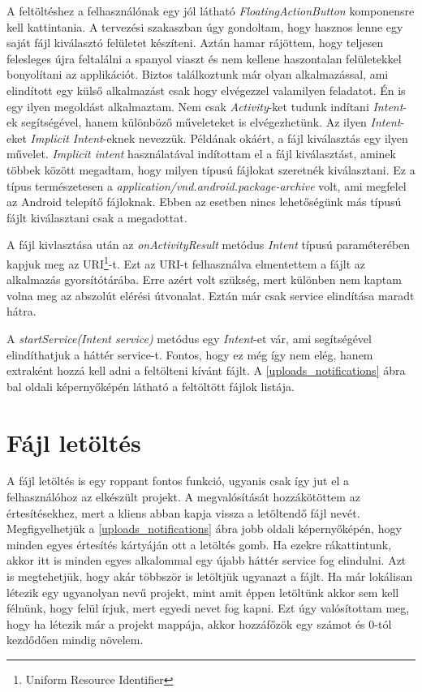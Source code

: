 \documentclass{thesis-ekf}
\theoremstyle{definition}
\theoremstyle{remark}
\begin{document}
A feltöltéshez a felhasználónak egy jól látható \emph{FloatingActionButton} komponensre kell kattintania.
A tervezési szakaszban úgy gondoltam, hogy hasznos lenne egy saját fájl kiválasztó felületet készíteni.
Aztán hamar rájöttem, hogy teljesen felesleges újra feltalálni a spanyol viaszt és nem kellene haszontalan felületekkel bonyolítani az applikációt.
Biztos találkoztunk már olyan alkalmazással, ami elindított egy külső alkalmazást csak hogy elvégezzel valamilyen feladatot.
Én is egy ilyen megoldást alkalmaztam.
Nem csak \emph{Activity}-ket tudunk indítani \emph{Intent}-ek segítségével, hanem különböző műveleteket is elvégezhetünk.
Az ilyen \emph{Intent}-eket \emph{Implicit Intent}-eknek nevezzük.
Példának okáért, a fájl kiválasztás egy ilyen művelet.
\emph{Implicit intent} használatával indítottam el a fájl kiválasztást, aminek többek között megadtam, hogy milyen típusú fájlokat szeretnék kiválasztani.
Ez a típus természetesen a \emph{application/vnd.android.package-archive} volt, ami megfelel az Android telepítő fájloknak.
Ebben az esetben nincs lehetőségünk más típusú fájlt kiválasztani csak a megadottat.

A fájl kivlasztása után az \emph{onActivityResult} metódus \emph{Intent} típusú paraméterében kapjuk meg az URI\footnote{Uniform Resource Identifier}-t.
Ezt az URI-t felhasználva elmentettem a fájlt az alkalmazás gyorsítótárába.
Erre azért volt szükség, mert különben nem kaptam volna meg az abszolút elérési útvonalat.
Eztán már csak service elindítása maradt hátra. 

A \emph{startService(Intent service)} metódus egy \emph{Intent}-et vár, ami segítségével elindíthatjuk a háttér service-t.
Fontos, hogy ez még így nem elég, hanem extraként hozzá kell adni a feltölteni kívánt fájlt.
A \ref{uploads_notifications} ábra bal oldali képernyőképén látható a feltöltött fájlok listája.

\section{Fájl letöltés}

A fájl letöltés is egy roppant fontos funkció, ugyanis csak így jut el a felhasználóhoz az elkészült projekt.
A megvalósítását hozzákötöttem az értesítésekhez, mert a kliens abban kapja vissza a letöltendő fájl nevét.
Megfigyelhetjük a \ref{uploads_notifications} ábra jobb oldali képernyőképén, hogy minden egyes értesítés kártyáján ott a letöltés gomb.
Ha ezekre rákattintunk, akkor itt is minden egyes alkalommal egy újabb háttér service fog elindulni.
Azt is megtehetjük, hogy akár többször is letöltjük ugyanazt a fájlt.
Ha már lokálisan létezik egy ugyanolyan nevű projekt, mint amit éppen letöltünk akkor sem kell félnünk, hogy felül írjuk, mert egyedi nevet fog kapni.
Ezt úgy valósítottam meg, hogy ha létezik már a projekt mappája, akkor hozzáfőzök egy számot és 0-tól kezdődően mindig növelem.
\end{document}
